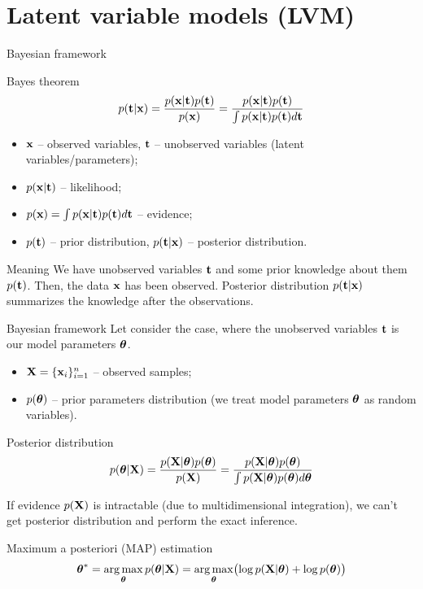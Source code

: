 \section{Latent variable models (LVM)}
\begin{frame}{Bayesian framework}
	\begin{block}{Bayes theorem}
		\[
			p(\mathbf{t} | \mathbf{x}) = \frac{p(\mathbf{x} | \mathbf{t}) p(\mathbf{t})}{p(\mathbf{x})} = \frac{p(\mathbf{x} | \mathbf{t}) p(\mathbf{t})}{\int p(\mathbf{x} | \mathbf{t}) p(\mathbf{t}) d \mathbf{t}} 
		\]
		\begin{itemize}
			\item $\mathbf{x}$ -- observed variables, $\mathbf{t}$ -- unobserved variables (latent variables/parameters);
			\item $p(\mathbf{x} | \mathbf{t})$ -- likelihood;
			\item $p(\mathbf{x}) = \int p(\mathbf{x} | \mathbf{t}) p(\mathbf{t}) d \mathbf{t}$ -- evidence;
			\item $p(\mathbf{t})$ -- prior distribution, $p(\mathbf{t} | \mathbf{x})$ -- posterior distribution.
		\end{itemize}
	\end{block}
	\begin{block}{Meaning}
		We have unobserved variables $\mathbf{t}$ and some prior knowledge about them $p(\mathbf{t})$. Then, the data $\mathbf{x}$ has been observed. 
		Posterior distribution $p(\mathbf{t} | \mathbf{x})$ summarizes the knowledge after the observations.
	\end{block}
\end{frame}
\begin{frame}{Bayesian framework}
	Let consider the case, where the unobserved variables $\mathbf{t}$ is our model parameters $\boldsymbol{\theta}$.
	\begin{itemize}
		\item $\mathbf{X} = \{\mathbf{x}_i\}_{i=1}^n$ -- observed samples;
		\item $p(\boldsymbol{\theta})$ -- prior parameters distribution (we treat model parameters $\boldsymbol{\theta}$ as random variables).
	\end{itemize}
	\begin{block}{Posterior distribution}
		\[
			p(\boldsymbol{\theta} | \mathbf{X}) = \frac{p(\mathbf{X} | \boldsymbol{\theta}) p(\boldsymbol{\theta})}{p(\mathbf{X})} = \frac{p(\mathbf{X} | \boldsymbol{\theta}) p(\boldsymbol{\theta})}{\int p(\mathbf{X} | \boldsymbol{\theta}) p(\boldsymbol{\theta}) d \boldsymbol{\theta}} 
		\]
		\vspace{-0.2cm}
	\end{block}
	If evidence $p(\mathbf{X})$ is intractable (due to multidimensional integration), we can't get posterior distribution and perform the exact inference.
    \begin{block}{Maximum a posteriori (MAP) estimation}
    \vspace{-0.2cm}
    \[
        \boldsymbol{\theta}^* = \operatorname*{arg\,max}_{\boldsymbol{\theta}} p(\boldsymbol{\theta} | \mathbf{X}) = \operatorname*{arg\,max}_{\boldsymbol{\theta}} \bigl(\log p(\mathbf{X} | \boldsymbol{\theta}) + \log p(\boldsymbol{\theta}) \bigr)
    \]
    \end{block}
\end{frame}
